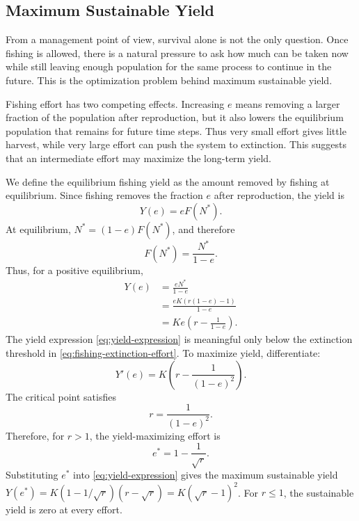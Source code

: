 \documentclass{article}
\numberwithin{equation}{section}
\begin{document}
\subsection{Maximum Sustainable Yield}
From a management point of view, survival alone is not the only
question. Once fishing is allowed, there is a natural pressure to ask how
much can be taken now while still leaving enough population for the same
process to continue in the future. This is the
optimization problem behind maximum sustainable yield.

Fishing effort has two competing effects. Increasing $e$ means removing
a larger fraction of the population after reproduction, but it also
lowers the equilibrium population that remains for future time steps.
Thus very small effort gives little harvest, while very large effort can
push the system to extinction. This suggests that an intermediate effort
may maximize the long-term yield.

We define the equilibrium fishing yield as the amount removed by fishing
at equilibrium. Since fishing removes the fraction $e$ after
reproduction, the yield is
\begin{equation*}
    Y(e)=eF(N^*).
\end{equation*}
At equilibrium, $N^*=(1-e)F(N^*)$, and therefore
\begin{equation*}
    F(N^*)=\frac{N^*}{1-e}.
\end{equation*}
Thus, for a positive equilibrium,
\begin{equation}
    \label{eq:yield-expression}
    \begin{aligned}
        Y(e)
            &= \frac{eN^*}{1-e}\\
            &= \frac{eK(r(1-e)-1)}{1-e}\\
            &= Ke\left(r-\frac{1}{1-e}\right).
    \end{aligned}
\end{equation}
The yield expression \eqref{eq:yield-expression} is meaningful only
below the extinction threshold in \eqref{eq:fishing-extinction-effort}.
To maximize yield, differentiate:
\begin{equation*}
    Y'(e)=K\left(r-\frac{1}{(1-e)^2}\right).
\end{equation*}
The critical point satisfies
\begin{equation*}
    r=\frac{1}{(1-e)^2}.
\end{equation*}
Therefore, for $r>1$, the yield-maximizing effort is
\begin{equation}
    \label{eq:yield-optimal-effort}
    e^*=1-\frac{1}{\sqrt{r}}.
\end{equation}
Substituting $e^*$ into \eqref{eq:yield-expression} gives the maximum
sustainable yield $Y(e^*)=K(1-1/\sqrt r)(r-\sqrt r)=K(\sqrt r-1)^2$.
For $r\leq1$, the sustainable yield is zero at every effort.
\end{document}
